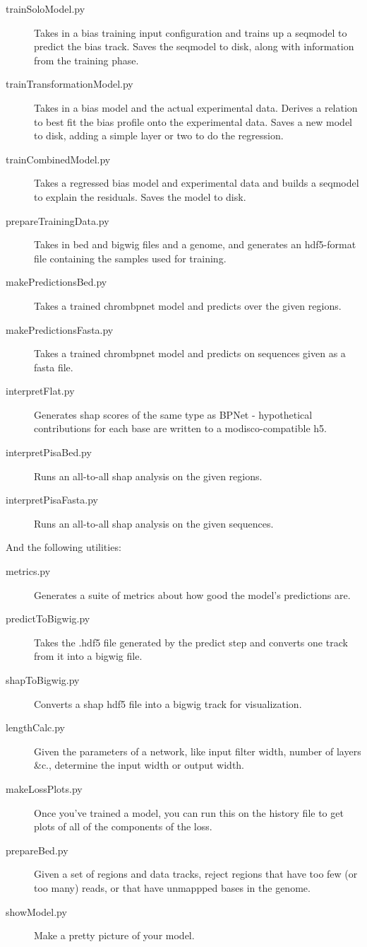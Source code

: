 \documentclass{article}
\begin{document}
\begin{description}
    \item [trainSoloModel.py] Takes in a bias training input configuration and trains up a seqmodel to predict the bias track. Saves the seqmodel to disk, along with information from the training phase. 
    \item [trainTransformationModel.py] Takes in a bias model and the actual experimental data. Derives a relation to best fit the bias profile onto the experimental data. Saves a new model to disk, adding a simple layer or two to do the regression. 
    \item [trainCombinedModel.py] Takes a regressed bias model and experimental data and builds a seqmodel to explain the residuals. Saves the model to disk.
    \item [prepareTrainingData.py] Takes in bed and bigwig files and a genome, and generates an hdf5-format file containing the samples used for training.  
    \item [makePredictionsBed.py] Takes a trained chrombpnet model and predicts over the given regions. 
    \item [makePredictionsFasta.py] Takes a trained chrombpnet model and predicts on sequences given as a fasta file.
    \item [interpretFlat.py] Generates shap scores of the same type as BPNet - hypothetical contributions for each base are written to a modisco-compatible h5. 
    \item [interpretPisaBed.py] Runs an all-to-all shap analysis on the given regions. 
    \item [interpretPisaFasta.py] Runs an all-to-all shap analysis on the given sequences. 
\end{description}

And the following utilities:

\begin{description}
    \item [metrics.py] Generates a suite of metrics about how good the model's predictions are. 
    \item [predictToBigwig.py] Takes the .hdf5 file generated by the predict step and converts one track from it into a bigwig file.
    \item [shapToBigwig.py] Converts a shap hdf5 file into a bigwig track for visualization. 
    \item [lengthCalc.py] Given the parameters of a network, like input filter width, number of layers \&c., determine the input width or output width.
    \item [makeLossPlots.py] Once you've trained a model, you can run this on the history file to get plots of all of the components of the loss. 
    \item [prepareBed.py] Given a set of regions and data tracks, reject regions that have too few (or too many) reads, or that have unmappped bases in the genome.
    \item [showModel.py] Make a pretty picture of your model.
\end{description}
\end{document}
